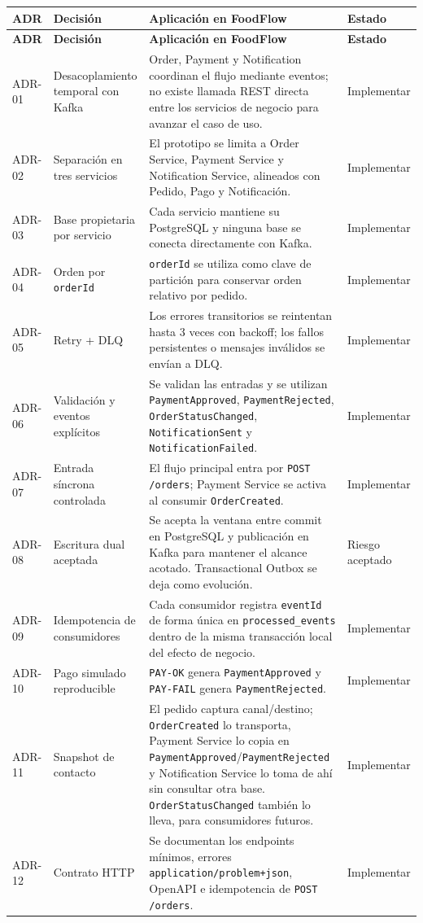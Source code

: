 \documentclass[12pt,a4paper]{article}
\begin{document}
\scriptsize
\setlength{\tabcolsep}{3pt}
\begin{longtable}{P{0.14\textwidth} P{0.20\textwidth} P{0.42\textwidth} P{0.13\textwidth}}
\toprule
\textbf{ADR} & \textbf{Decisión} & \textbf{Aplicación en FoodFlow} & \textbf{Estado} \\
\midrule
\endfirsthead
\toprule
\textbf{ADR} & \textbf{Decisión} & \textbf{Aplicación en FoodFlow} & \textbf{Estado} \\
\midrule
\endhead
ADR-01 & Desacoplamiento temporal con Kafka & Order, Payment y Notification coordinan el flujo mediante eventos; no existe llamada REST directa entre los servicios de negocio para avanzar el caso de uso. & Implementar \\
ADR-02 & Separación en tres servicios & El prototipo se limita a Order Service, Payment Service y Notification Service, alineados con Pedido, Pago y Notificación. & Implementar \\
ADR-03 & Base propietaria por servicio & Cada servicio mantiene su PostgreSQL y ninguna base se conecta directamente con Kafka. & Implementar \\
ADR-04 & Orden por \texttt{orderId} & \texttt{orderId} se utiliza como clave de partición para conservar orden relativo por pedido. & Implementar \\
ADR-05 & Retry + DLQ & Los errores transitorios se reintentan hasta 3 veces con backoff; los fallos persistentes o mensajes inválidos se envían a DLQ. & Implementar \\
ADR-06 & Validación y eventos explícitos & Se validan las entradas y se utilizan \texttt{PaymentApproved}, \texttt{PaymentRejected}, \texttt{OrderStatusChanged}, \texttt{NotificationSent} y \texttt{NotificationFailed}. & Implementar \\
ADR-07 & Entrada síncrona controlada & El flujo principal entra por \texttt{POST /orders}; Payment Service se activa al consumir \texttt{OrderCreated}. & Implementar \\
ADR-08 & Escritura dual aceptada & Se acepta la ventana entre commit en PostgreSQL y publicación en Kafka para mantener el alcance acotado. Transactional Outbox se deja como evolución. & Riesgo aceptado \\
ADR-09 & Idempotencia de consumidores & Cada consumidor registra \texttt{eventId} de forma única en \texttt{processed\_events} dentro de la misma transacción local del efecto de negocio. & Implementar \\
ADR-10 & Pago simulado reproducible & \texttt{PAY-OK} genera \texttt{PaymentApproved} y \texttt{PAY-FAIL} genera \texttt{PaymentRejected}. & Implementar \\
ADR-11 & Snapshot de contacto & El pedido captura canal/destino; \texttt{OrderCreated} lo transporta, Payment Service lo copia en \texttt{PaymentApproved}/\texttt{PaymentRejected} y Notification Service lo toma de ahí sin consultar otra base. \texttt{OrderStatusChanged} también lo lleva, para consumidores futuros. & Implementar \\
ADR-12 & Contrato HTTP & Se documentan los endpoints mínimos, errores \texttt{application/problem+json}, OpenAPI e idempotencia de \texttt{POST /orders}. & Implementar \\
\bottomrule
\end{longtable}
\end{document}
